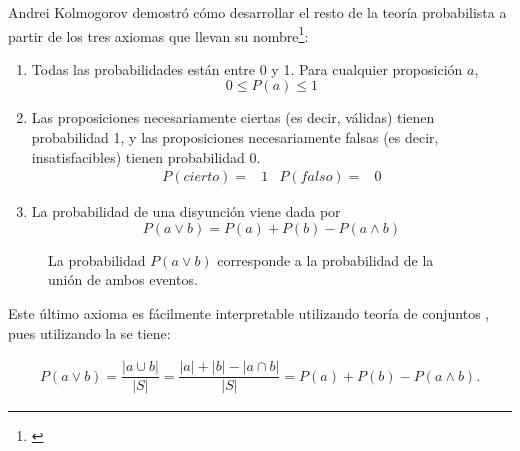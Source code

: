 Andrei Kolmogorov demostró cómo desarrollar el resto de la teoría probabilista a partir de los tres axiomas que llevan su nombre\footnote{\cite{Russell2004}}:

\begin{enumerate}
 \item Todas las probabilidades están entre 0 y 1. Para cualquier proposición $a$,
 \begin{equation}
  0 \leq P(a)\leq 1
 \end{equation}
 
 \item Las proposiciones necesariamente ciertas (es decir, válidas) tienen probabilidad 1, y las proposiciones necesariamente falsas (es decir, insatisfacibles) tienen probabilidad 0.
 \begin{align}
  P(cierto) =& 1 & P(falso) =& 0
 \end{align}
 
 \item La probabilidad de una disyunción viene dada por
 \begin{equation}
  P(a \lor b) = P(a) + P(b) - P(a \land b)
 \end{equation}
\end{enumerate}

\begin{figure}
  \centering
  \def\firstcircle{(0,0) circle (1.5cm)}
  \def\secondcircle{(0:2cm) circle (1.5cm)}
  \def\universesquare{(-2,-2) rectangle (4,2)}
  \caption{La probabilidad $P(a \lor b)$ corresponde a la probabilidad de la unión de ambos eventos.}\label{fig:p_or}
\end{figure}

Este último axioma es fácilmente interpretable utilizando teoría de conjuntos , pues utilizando la  se tiene:

\begin{align*}
 P(a \lor b) = \dfrac{|a \cup b|}{|S|} = \dfrac{|a| + |b| - |a \cap b|}{|S|} = P(a) + P(b) - P(a \land b).
\end{align*}




